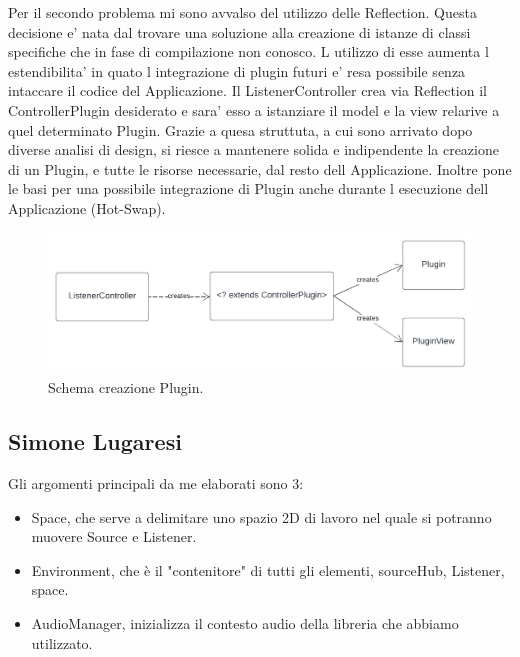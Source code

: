 \documentclass[a4paper,12pt]{report}
\begin{document}
%
Per il secondo problema mi sono avvalso del utilizzo delle Reflection. Questa decisione e' nata dal trovare una soluzione alla creazione di istanze di classi specifiche che in fase di compilazione non conosco. L utilizzo di esse aumenta l estendibilita' in quato l integrazione di plugin futuri e' resa possibile senza intaccare il codice del Applicazione. Il ListenerController crea via Reflection il ControllerPlugin desiderato e sara' esso a istanziare il model e la view relarive a quel determinato Plugin. Grazie a quesa struttuta, a cui sono arrivato dopo diverse analisi di design, si riesce a mantenere solida e indipendente la creazione di un Plugin, e tutte le risorse necessarie, dal resto dell Applicazione. Inoltre pone le basi per una possibile integrazione di Plugin anche durante l esecuzione dell Applicazione (Hot-Swap).
\begin{figure}[H]
\centering{}
\includegraphics[width=\textwidth]{img/listener/PluginCreates.png}
\caption{Schema creazione Plugin.}
\label{img:Listener}
\end{figure}

\subsection*{Simone Lugaresi}
Gli argomenti principali da me elaborati sono 3:
\begin{itemize}
	\item Space, che serve a delimitare uno spazio 2D di lavoro nel quale si potranno muovere Source e Listener.
	\item Environment, che è il "contenitore" di tutti gli elementi, sourceHub, Listener, space.
	\item AudioManager, inizializza il contesto audio della libreria che abbiamo utilizzato.
\end{itemize}
\end{document}
